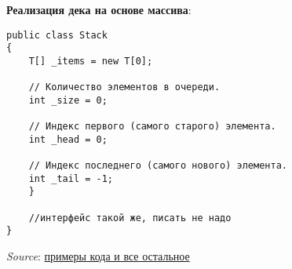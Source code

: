 \noindent\textbf{Реализация дека на основе массива}:
\begin{verbatim}
public class Stack
{
    T[] _items = new T[0];

    // Количество элементов в очереди.
    int _size = 0;

    // Индекс первого (самого старого) элемента.
    int _head = 0;

    // Индекс последнего (самого нового) элемента.
    int _tail = -1;
    }

	//интерфейс такой же, писать не надо
}
\end{verbatim}

\noindent\textit{Source}: \href{https://tproger.ru/translations/stacks-and-queues-for-beginners/amp/}{примеры кода и все остальное}
